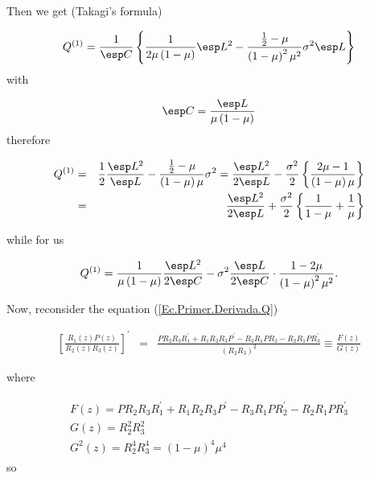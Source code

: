 Then we get (Takagi's formula)

\begin{eqnarray*}
Q^{(1)}=\frac{1}{\esp C}\left\{\frac{1}{2\mu\left(1-\mu\right)}\esp L^{2}-\frac{\frac{1}{2}-\mu}{\left(1-\mu\right)^{2}\mu^{2}}\sigma^{2}\esp L\right\}
\end{eqnarray*}
with

\begin{eqnarray*}
\esp C = \frac{\esp L}{\mu\left(1-\mu\right)}
\end{eqnarray*}
therefore

\begin{eqnarray*}
Q^{(1)}&=&\frac{1}{2}\frac{\esp L^{2}}{\esp L}-\frac{\frac{1}{2}-\mu}{\left(1-\mu\right)\mu}\sigma^{2}
=\frac{\esp L^{2}}{2\esp L}-\frac{\sigma^{2}}{2}\left\{\frac{2\mu-1}{\left(1-\mu\right)\mu}\right\}\\
&=&\frac{\esp L^{2}}{2\esp L}+\frac{\sigma^{2}}{2}\left\{\frac{1}{1-\mu}+\frac{1}{\mu}\right\}
\end{eqnarray*}

while for us

\begin{eqnarray*}
Q^{(1)}=\frac{1}{\mu\left(1-\mu\right)}\frac{\esp L^{2}}{2\esp C}
-\sigma^{2}\frac{\esp L}{2\esp C}\cdot\frac{1-2\mu}{\left(1-\mu\right)^{2}\mu^{2}}.
\end{eqnarray*}

Now, reconsider the equation (\ref{Ec.Primer.Derivada.Q})

\begin{eqnarray*}
\left[\frac{R_{1}\left(z\right)P\left(z\right)}{R_{2}\left(z\right)R_{3}\left(z\right)}\right]^{'}&=&\frac{PR_{2}R_{3}R_{1}^{'}
+R_{1}R_{2}R_{3}P^{'}-R_{3}R_{1}PR_{2}-R_{2}R_{1}PR_{3}^{'}}{\left(R_{2}R_{3}\right)^{2}}
\equiv\frac{F\left(z\right)}{G\left(z\right)}
\end{eqnarray*}

where

\begin{eqnarray}
\begin{array}{l}
F\left(z\right)=PR_{2}R_{3}R_{1}^{'}
+R_{1}R_{2}R_{3}P^{'}-R_{3}R_{1}PR_{2}^{'}-R_{2}R_{1}PR_{3}^{'}\\
G\left(z\right)=R_{2}^{2}R_{3}^{2}\\
G^{2}\left(z\right)=R_{2}^{4}R_{3}^{4}=\left(1-\mu\right)^{4}\mu^{4}
\end{array}
\end{eqnarray}
so 

